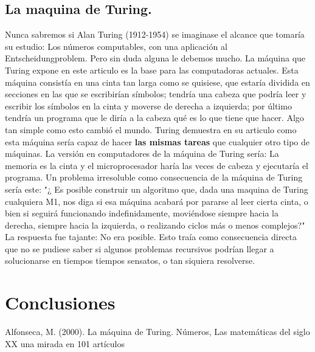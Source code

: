 \documentclass[12pt]{article}
\begin{document}
\subsection {La maquina de Turing.}
Nunca sabremos si Alan Turing (1912-1954) se imaginase el alcance que tomaría su estudio: Los números computables, con una aplicación al Entscheidungproblem. Pero sin duda alguna le debemos mucho. La máquina que Turing expone en este articulo es la base para las computadoras actuales. Esta máquina consistía en una cinta tan larga como se quisiese, que estaría dividida en secciones en las que se escribirían símbolos; tendría una cabeza que podría leer y escribir los símbolos en la cinta y moverse de derecha a izquierda; por último tendría un programa que le diría a la cabeza qué es lo que tiene que hacer. Algo tan simple como esto cambió el mundo. Turing demuestra en su articulo como esta máquina sería capaz de hacer \textbf{las mismas tareas} que cualquier otro tipo de máquinas.
\newline
La versión en computadores de la máquina de Turing sería: La memoria es la cinta y el microprocesador haría las veces de cabeza y ejecutaría el programa.
\newline
Un problema irresoluble como consecuencia de la máquina de Turing sería este:
\newline
"¿ Es posible construir un algoritmo que, dada una maquina de Turing cualquiera M1, nos diga si esa máquina acabará por pararse al leer cierta cinta, o bien si seguirá funcionando indefinidamente, moviéndose siempre hacia la derecha, siempre hacia la izquierda, o realizando ciclos más o menos complejos?"\cite{Alfonseca}
\newline
La respuesta fue tajante: No era posible. Esto traía como consecuencia directa que no se pudiese saber si algunos problemas recursivos podrían llegar a solucionarse en tiempos tiempos sensatos, o tan siquiera resolverse.
\section {Conclusiones}
\begin{thebibliography}{1}
 Alfonseca, M. (2000). La máquina de Turing. Números, Las matemáticas del siglo XX una mirada en 101 artículos
\end{thebibliography}
\end{document}
